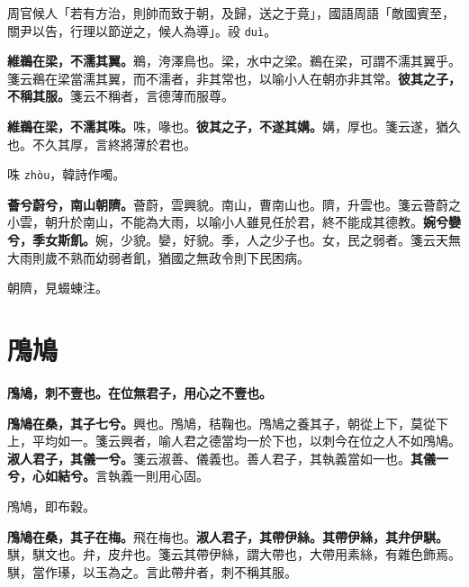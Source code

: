 \begin{quoting}周官候人「若有方治，則帥而致于朝，及歸，送之于竟」，國語周語「敵國賓至，關尹以告，行理以節逆之，候人為導」。祋 \texttt{duì}。\end{quoting}

\textbf{維鵜在梁，不濡其翼。}{\footnotesize 鵜，洿澤鳥也。梁，水中之梁。鵜在梁，可謂不濡其翼乎。箋云鵜在梁當濡其翼，而不濡者，非其常也，以喻小人在朝亦非其常。}\textbf{彼其之子，不稱其服。}{\footnotesize 箋云不稱者，言德薄而服尊。}

\textbf{維鵜在梁，不濡其咮。}{\footnotesize 咮，喙也。}\textbf{彼其之子，不遂其媾。}{\footnotesize 媾，厚也。箋云遂，猶久也。不久其厚，言終將薄於君也。}

\begin{quoting}咮 \texttt{zhòu}，韓詩作噣。\end{quoting}

\textbf{薈兮蔚兮，南山朝隮。}{\footnotesize 薈蔚，雲興貌。南山，曹南山也。隮，升雲也。箋云薈蔚之小雲，朝升於南山，不能為大雨，以喻小人雖見任於君，終不能成其德教。}\textbf{婉兮孌兮，季女斯飢。}{\footnotesize 婉，少貌。孌，好貌。季，人之少子也。女，民之弱者。箋云天無大雨則歲不熟而幼弱者飢，猶國之無政令則下民困病。}

\begin{quoting}朝隮，見蝃蝀注。\end{quoting}

\section{鳲鳩}


\textbf{鳲鳩，刺不壹也。在位無君子，用心之不壹也。}{\footnotesize }

\textbf{鳲鳩在桑，其子七兮。}{\footnotesize 興也。鳲鳩，秸鞠也。鳲鳩之養其子，朝從上下，莫從下上，平均如一。箋云興者，喻人君之德當均一於下也，以刺今在位之人不如鳲鳩。}\textbf{淑人君子，其儀一兮。}{\footnotesize 箋云淑善、儀義也。善人君子，其執義當如一也。}\textbf{其儀一兮，心如結兮。}{\footnotesize 言執義一則用心固。}

\begin{quoting}鳲鳩，即布穀。\end{quoting}

\textbf{鳲鳩在桑，其子在梅。}{\footnotesize 飛在梅也。}\textbf{淑人君子，其帶伊絲。其帶伊絲，其弁伊騏。}{\footnotesize 騏，騏文也。弁，皮弁也。箋云其帶伊絲，謂大帶也，大帶用素絲，有雜色飾焉。騏，當作𤪌，以玉為之。言此帶弁者，刺不稱其服。}

